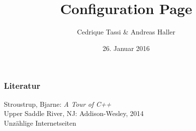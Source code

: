 \documentclass{beamer}
\title{Configuration Page}
\institute{C++ Practice an der Universität Heidelberg}
\author{Cedrique Tassi \& Andreas Haller}
\date{26. Januar 2016}
\begin{document}



\maketitle

\begin{frame}
	\frametitle{Literatur}
	\centering
	Stroustrup, Bjarne: \textit{A Tour of C++}\\
	Upper Saddle River, NJ: Addison-Wesley, 2014\\
\vspace{2em}
	Unzählige Internetseiten\\
\end{frame}

\Large

\end{document}
